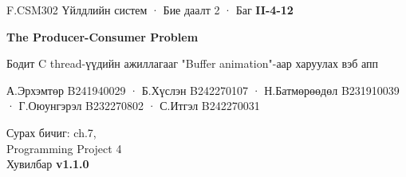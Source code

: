 \documentclass{article}
\begin{document}
\fontsize{12}{15}\selectfont

\begin{tcolorbox}[enhanced, colback=ink, colframe=ink, arc=8pt, left=16pt, right=16pt, top=9pt, bottom=9pt, after skip=7pt]
\color{white}
\begin{minipage}[c]{0.8\linewidth}\raggedright
{\fontsize{12.5}{15}\selectfont F.CSM302 Үйлдлийн систем · Бие даалт 2 · Баг \textbf{II-4-12}\par}
\vspace{5pt}
{\bfseries\fontsize{32}{36}\selectfont The Producer-Consumer Problem\par}
\vspace{5pt}
{\fontsize{15}{18}\selectfont Бодит C thread-үүдийн ажиллагааг "Buffer animation"-аар харуулах вэб апп\par}
\vspace{7pt}
{\fontsize{12}{14.5}\selectfont А.Эрхэмтөр B241940029 · Б.Хүслэн B242270107 · Н.Батмөрөөдөл B231910039 · Г.Оюунгэрэл B232270802 · С.Итгэл B242270031\par}
\end{minipage}\hfill
\begin{minipage}[c]{0.18\linewidth}\raggedleft
{\fontsize{12}{14.5}\selectfont Сурах бичиг: ch.7,\\ Programming Project 4\\[4pt] Хувилбар \textbf{v1.1.0}\par}
\end{minipage}
\end{tcolorbox}
\end{document}
